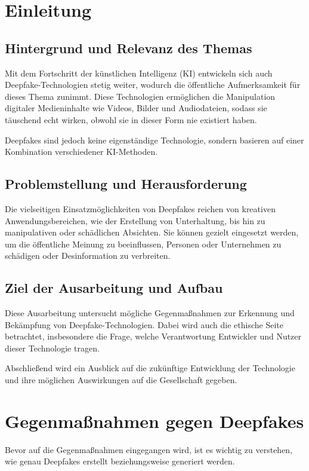 \documentclass[a4paper,12pt]{article}
\begin{document}
\section{Einleitung}
\subsection{Hintergrund und Relevanz des Themas}
Mit dem Fortschritt der künstlichen Intelligenz (KI) entwickeln sich auch Deepfake-Technologien stetig weiter, wodurch die öffentliche Aufmerksamkeit für dieses Thema zunimmt. Diese Technologien ermöglichen die Manipulation digitaler Medieninhalte wie Videos, Bilder und Audiodateien, sodass sie täuschend echt wirken, obwohl sie in dieser Form nie existiert haben.

Deepfakes sind jedoch keine eigenständige Technologie, sondern basieren auf einer Kombination verschiedener KI-Methoden. \cite{BVDW2024}\\

\subsection{Problemstellung und Herausforderung}
Die vielseitigen Einsatzmöglichkeiten von Deepfakes reichen von kreativen Anwendungsbereichen, wie der Erstellung von Unterhaltung, bis hin zu manipulativen oder schädlichen Absichten. Sie können gezielt eingesetzt werden, um die öffentliche Meinung zu beeinflussen, Personen oder Unternehmen zu schädigen oder Desinformation zu verbreiten.\cite{CounterExtremism2020}\\

\subsection{Ziel der Ausarbeitung und Aufbau}
Diese Ausarbeitung untersucht mögliche Gegenmaßnahmen zur Erkennung und Bekämpfung von Deepfake-Technologien. Dabei wird auch die ethische Seite betrachtet, insbesondere die Frage, welche Verantwortung Entwickler und Nutzer dieser Technologie tragen.  

Abschließend wird ein Ausblick auf die zukünftige Entwicklung der Technologie und ihre möglichen Auswirkungen auf die Gesellschaft gegeben.
\newpage

\section{Gegenmaßnahmen gegen Deepfakes}
Bevor auf die Gegenmaßnahmen eingegangen wird, ist es wichtig zu verstehen, wie genau Deepfakes erstellt beziehungsweise generiert werden.  
\end{document}
